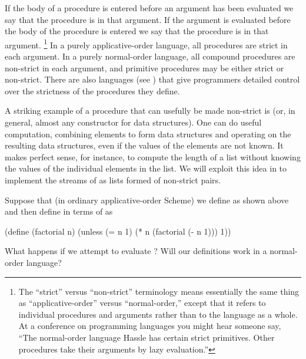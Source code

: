 If the body of a procedure is entered before an argument has been evaluated we say that the procedure is  in that argument.
If the argument is evaluated before the body of the procedure is entered we say that the procedure is  in that argument.%
\footnote{
	The “strict” versus “non-strict” terminology means essentially the same thing as “applicative-order”  versus  “normal-order,” except that it refers to individual procedures and arguments rather than to the language as a whole.
	At a conference on programming languages you might hear someone say, “The normal-order language Hassle has certain strict primitives.
	Other procedures take their arguments by lazy evaluation.”
}
In a purely applicative-order language, all procedures are strict in each argument.
In a purely normal-order language, all compound procedures are non-strict in each argument, and primitive procedures may be either strict or non-strict.
There are also languages (see ) that give programmers detailed control over the strictness of the procedures they define.

A striking example of a procedure that can usefully be made non-strict is  (or, in general, almost any constructor for data structures).
One can do useful computation, combining elements to form data structures and operating on the resulting data structures, even if the values of the elements are not known.
It makes perfect sense, for instance, to compute the length of a list without knowing the values of the individual elements in the list.
We will exploit this idea in  to implement the streams of  as lists formed of non-strict  pairs.



\begin{exercise}
	\label{Exercise 4.25}
	Suppose that (in ordinary applicative-order Scheme) we define  as shown above and then define  in terms of  as
	\begin{scheme}
	  (define (factorial n)
	    (unless (= n 1)
	            (* n (factorial (- n 1)))
	            1))
	\end{scheme}
	What happens if we attempt to evaluate ?
	Will our definitions work in a normal-order language?
\end{exercise}



